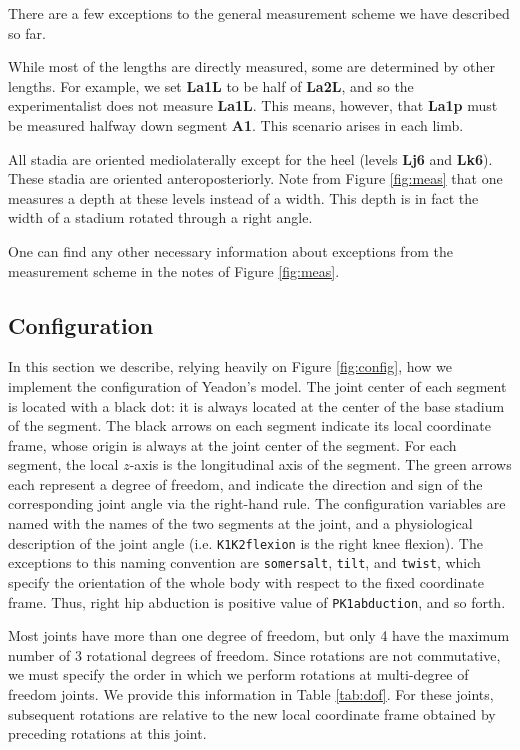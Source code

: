 \documentclass[10pt]{article}
\begin{document}
There are a few exceptions to the general measurement scheme we have described
so far.

While most of the lengths are directly measured, some are determined by other
lengths. For example, we set \textbf{La1L} to be half of \textbf{La2L}, and so
the experimentalist does not measure \textbf{La1L}. This means, however, that
\textbf{La1p} must be measured halfway down segment \textbf{A1}. This scenario
arises in each limb.

All stadia are oriented mediolaterally except for the heel (levels
\textbf{Lj6} and \textbf{Lk6}). These stadia are oriented anteroposteriorly.
Note from Figure \ref{fig:meas} that one measures a depth at these levels
instead of a width. This depth is in fact the width of a stadium rotated
through a right angle.

One can find any other necessary information about exceptions from the
measurement scheme in the notes of Figure \ref{fig:meas}.

\subsection*{Configuration}

In this section we describe, relying heavily on Figure \ref{fig:config}, how
we implement the configuration of Yeadon's model. The joint center of each
segment is located with a black dot: it is always located at the center of the
base stadium of the segment. The black arrows on each segment indicate its
local coordinate frame, whose origin is always at the joint center of the
segment. For each segment, the local $z$-axis is the longitudinal axis of the
segment. The green arrows each represent a degree of freedom, and indicate the
direction and sign of the corresponding joint angle via the right-hand rule.
The configuration variables are named with the names of the two segments at
the joint, and a physiological description of the joint angle (i.e.
\verb+K1K2flexion+ is the right knee flexion). The exceptions to this naming
convention are \verb+somersalt+, \verb+tilt+, and \verb+twist+, which specify
the orientation of the whole body with respect to the fixed coordinate frame.
Thus, right hip abduction is positive value of \verb+PK1abduction+, and so
forth.

Most joints have more than one degree of freedom, but only 4 have the maximum
number of 3 rotational degrees of freedom. Since rotations are not commutative,
we must specify the order in which we perform rotations at multi-degree of
freedom joints. We provide this information in Table \ref{tab:dof}. For these
joints, subsequent rotations are relative to the new local coordinate frame
obtained by preceding rotations at this joint.
\end{document}
